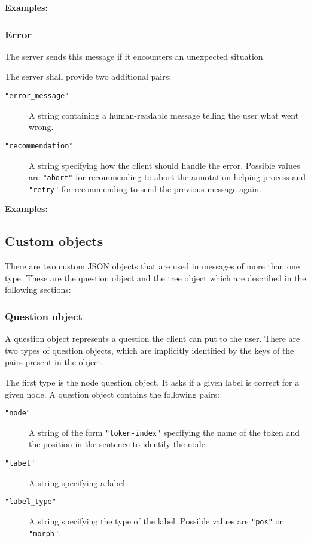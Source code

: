 \documentclass{scrartcl}
\newcommand{\jsstring}[1]{\texttt{\color{OrangeRed}"#1"}}
\newcommand{\Examples}{\noindent\textbf{Examples:}}
\begin{document}
\Examples



\subsubsection{Error}
\label{ssub:Error}

The server sends this message if it encounters an unexpected situation.

The server shall provide two additional pairs:
\begin{description}
    \item[\jsstring{error\_message}] A string containing a human-readable message telling the user what went wrong.
    \item[\jsstring{recommendation}] A string specifying how the client should handle the error.
        Possible values are \jsstring{abort} for recommending to abort the annotation helping process and \jsstring{retry} for recommending to send the previous message again.
\end{description}

\Examples



\subsection{Custom objects}
\label{sub:Custom objects}

There are two custom JSON objects that are used in messages of more than one type.
These are the question object and the tree object which are described in the following sections:

\subsubsection{Question object}
\label{ssub:Question object}

A question object represents a question the client can put to the user.
There are two types of question objects, which are implicitly identified by the keys of the pairs present in the object.

The first type is the node question object.
It asks if a given label is correct for a given node.
A question object contains the following pairs:
\begin{description}
    \item[\jsstring{node}] A string of the form \jsstring{token-index} specifying the name of the token and the position in the sentence to identify the node.
    \item[\jsstring{label}] A string specifying a label.
    \item[\jsstring{label\_type}] A string specifying the type of the label.
        Possible values are \jsstring{pos} or \jsstring{morph}.
\end{description}
\end{document}
